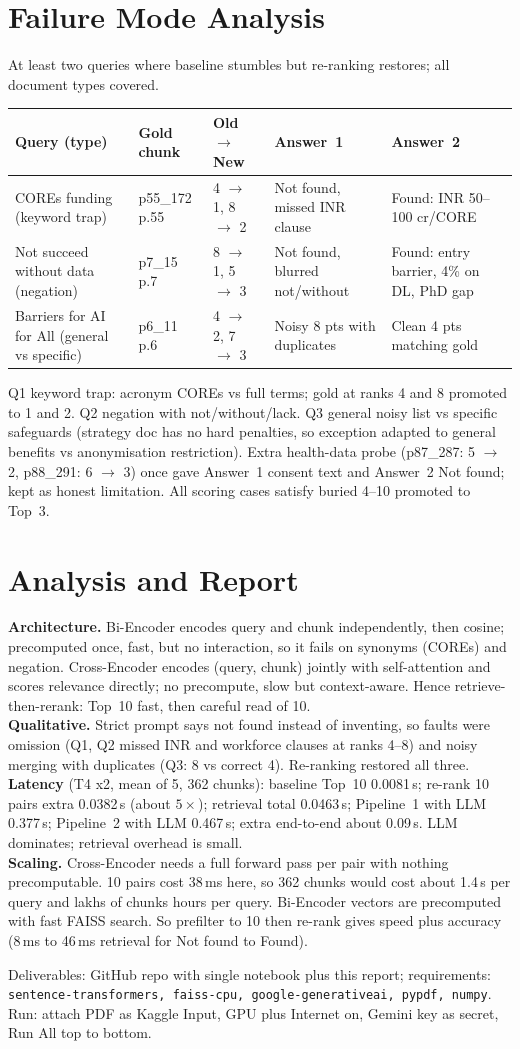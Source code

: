 \documentclass[11pt,a4paper]{article}
\begin{document}
\section{Failure Mode Analysis}
At least two queries where baseline stumbles but re-ranking restores; all document types covered.
\begin{center}\small
\begin{tabular}{@{}lllll@{}}
\toprule Query (type) & Gold chunk & Old $\to$ New & Answer~1 & Answer~2 \\
\midrule COREs funding (keyword trap) & p55\_172 p.55 & 4 $\to$ 1, 8 $\to$ 2 & Not found, missed INR clause & Found: INR 50--100 cr/CORE \\
Not succeed without data (negation) & p7\_15 p.7 & 8 $\to$ 1, 5 $\to$ 3 & Not found, blurred not/without & Found: entry barrier, 4\% on DL, PhD gap \\
Barriers for AI for All (general vs specific) & p6\_11 p.6 & 4 $\to$ 2, 7 $\to$ 3 & Noisy 8 pts with duplicates & Clean 4 pts matching gold \\
\bottomrule
\end{tabular}
\end{center}
Q1 keyword trap: acronym COREs vs full terms; gold at ranks 4 and 8 promoted to 1 and 2. Q2 negation with not/without/lack. Q3 general noisy list vs specific safeguards (strategy doc has no hard penalties, so exception adapted to general benefits vs anonymisation restriction). Extra health-data probe (p87\_287: 5 $\to$ 2, p88\_291: 6 $\to$ 3) once gave Answer~1 consent text and Answer~2 Not found; kept as honest limitation. All scoring cases satisfy buried 4--10 promoted to Top~3.

\section{Analysis and Report}
\textbf{Architecture.} Bi-Encoder encodes query and chunk independently, then cosine; precomputed once, fast, but no interaction, so it fails on synonyms (COREs) and negation. Cross-Encoder encodes (query, chunk) jointly with self-attention and scores relevance directly; no precompute, slow but context-aware. Hence retrieve-then-rerank: Top~10 fast, then careful read of 10. \\
\textbf{Qualitative.} Strict prompt says not found instead of inventing, so faults were omission (Q1, Q2 missed INR and workforce clauses at ranks 4--8) and noisy merging with duplicates (Q3: 8 vs correct 4). Re-ranking restored all three. \\
\textbf{Latency} (T4 x2, mean of 5, 362 chunks): baseline Top~10 0.0081\,s; re-rank 10 pairs extra 0.0382\,s (about $5\times$); retrieval total 0.0463\,s; Pipeline~1 with LLM 0.377\,s; Pipeline~2 with LLM 0.467\,s; extra end-to-end about 0.09\,s. LLM dominates; retrieval overhead is small. \\
\textbf{Scaling.} Cross-Encoder needs a full forward pass per pair with nothing precomputable. 10 pairs cost 38\,ms here, so 362 chunks would cost about 1.4\,s per query and lakhs of chunks hours per query. Bi-Encoder vectors are precomputed with fast FAISS search. So prefilter to 10 then re-rank gives speed plus accuracy (8\,ms to 46\,ms retrieval for Not found to Found).

\noindent Deliverables: GitHub repo with single notebook plus this report; requirements: \texttt{sentence-transformers, faiss-cpu, google-generativeai, pypdf, numpy}. Run: attach PDF as Kaggle Input, GPU plus Internet on, Gemini key as secret, Run All top to bottom.
\end{document}
